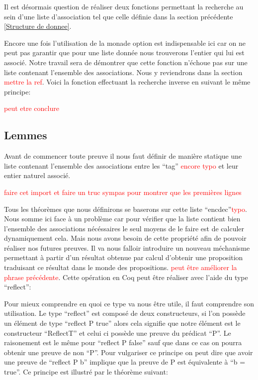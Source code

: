 \documentclass {article}
\newcommand{\codefrom}[3]
           {}
\theoremstyle{definition}
\theoremstyle{remark}
\newcommand{\todo}[1]{\textcolor{red}{#1}}
\begin{document}
Il est désormais question de réaliser deux fonctions permettant la recherche
au sein d'une liste d'association tel que celle définie dans la section précédente
\ref{Structure de donnee}.

\codefrom{src}{association_list}{lookup}

Encore une fois l'utilisation de la monade option est indispensable ici car
on ne peut pas garantir que pour une liste donnée nous trouverons l'entier
qui lui est associé. Notre travail sera de démontrer que cette fonction n'échoue pas
sur une liste contenant l'ensemble des associations. Nous y reviendrons dans la section
\todo{mettre la ref}.
Voici la fonction effectuant la recherche inverse en suivant le même principe:

\codefrom{src}{association_list}{lookdown}

\todo{peut etre conclure}




\subsection{Lemmes}

Avant de commencer toute preuve il nous faut définir de manière statique une liste
contenant l'ensemble des associations entre les ``tag'' \todo{encore typo} et leur entier naturel associé.

\todo{faire cet import et faire un truc sympas pour montrer que les premières lignes}
\codefrom{src}{association_list}{lol}

Tous les théorèmes que nous définirons se baserons sur cette liste ``encdec''\todo{typo}. \\
Nous somme ici face à un problème car pour vérifier que la liste contient bien l'ensemble des
associations nécéssaires le seul moyens de le faire est de calculer dynamiquement cela.
Mais nous avons besoin de cette propriété afin de pouvoir réaliser nos futures preuves.
Il va nous falloir introduire un nouveau méchanisme permettant à partir d'un résultat obtenue
par calcul d'obtenir une proposition traduisant ce résultat dans le monde des propositions.
\todo{peut être améliorer la phrase précédente}.
Cette opération en Coq peut être réaliser avec l'aide du type ``reflect'':

\codefrom{src}{association_list}{reflect}

Pour mieux comprendre en quoi ce type va nous être utile, il faut comprendre son utilisation.
Le type ``reflect'' est composé de deux constructeurs, si l'on possède un élément de type
``reflect P true'' alors cela signifie que notre élément est le constructeur ``ReflectT''
et celui ci possède une preuve du prédicat ``P''. Le raisonement est le même pour ``reflect P false''
sauf que dans ce cas on pourra obtenir une preuve de non ``P''. Pour vulgariser ce
principe on peut dire que avoir une preuve de ``reflect P b'' implique que la preuve
de P est équivalente à ``b = true''. Ce principe est illustré par le théorème suivant:
\end{document}
